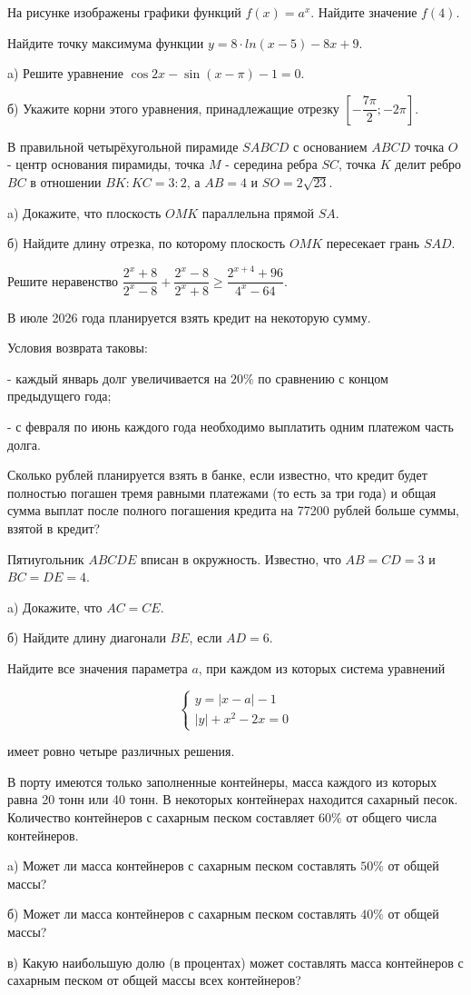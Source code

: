  На рисунке изображены графики функций $f(x)=a^x$. Найдите значение $f(4)$.

 Найдите точку максимума функции  $y=8\cdot ln(x-5) -8x+9$. 

 a) Решите уравнение $\cos 2x - \sin(x-\pi)-1=0$.

б) Укажите корни этого уравнения, принадлежащие отрезку $\left[-\dfrac{7 \pi}{2} ;-2\pi\right]$.

 В правильной четырёхугольной пирамиде $S A B C D$ с основанием $ABCD$ точка $O$ - центр основания пирамиды, точка $M$ - середина ребра $SC$, точка $K$ делит ребро $BC$ в отношении $BK:KC=3:2$, а $AB=4$ и $SO=2\sqrt{23}$.

a) Докажите, что плоскость $OMK$ параллельна прямой $SA$.

б) Найдите длину отрезка, по которому плоскость $OMK$ пересекает грань $SAD$.

 Решите неравенство $\dfrac{2^x+8}{2^x-8}+\dfrac{2^x-8}{2^x+8} \geqslant \dfrac{2^{x+4}+96}{4^x-64}$.


 В июле 2026 года планируется взять кредит на некоторую сумму. 

Условия возврата таковы:

- каждый январь долг увеличивается на $20 \%$ по сравнению с концом предыдущего года;

- с февраля по июнь каждого года необходимо выплатить одним платежом часть долга.

Сколько рублей планируется взять в банке, если известно, что кредит будет полностью погашен тремя равными платежами (то есть за три года) и общая сумма выплат после полного погашения кредита на 77200 рублей больше суммы, взятой в кредит?

 Пятиугольник $A B C D E$ вписан в окружность. Известно, что $A B=C D=3$ и $B C=D E=4$.

a) Докажите, что $A C=C E$.

б) Найдите длину диагонали $B E$, если $A D=6$.

 Найдите все значения параметра $a$, при каждом из которых система уравнений

$$
\left\{\begin{array}{l}
y=|x-a|-1 \\
|y|+x^2-2x=0
\end{array}\right.
$$


имеет ровно четыре различных решения.

 В порту имеются только заполненные контейнеры, масса каждого из которых равна 20 тонн или 40 тонн. В некоторых контейнерах находится сахарный песок. Количество контейнеров с сахарным песком составляет $60 \%$ от общего числа контейнеров.

a) Может ли масса контейнеров с сахарным песком составлять $50 \%$ от общей массы?

б) Может ли масса контейнеров с сахарным песком составлять $40 \%$ от общей массы?

в) Какую наибольшую долю (в процентах) может составлять масса контейнеров с сахарным песком от общей массы всех контейнеров?


